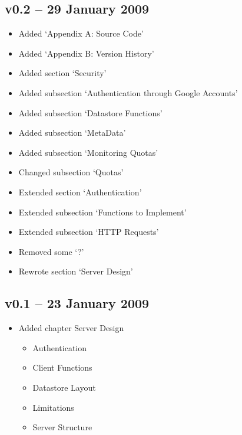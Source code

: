 \subsection*{v0.2 -- 29 January 2009}
\begin{itemize}
  \item Added `Appendix A: Source Code'
  \item Added `Appendix B: Version History'
  \item Added section `Security'
  \item Added subsection `Authentication through Google Accounts'
  \item Added subsection `Datastore Functions'
  \item Added subsection `MetaData'
  \item Added subsection `Monitoring Quotas'
  \item Changed subsection `Quotas'
  \item Extended section `Authentication'
  \item Extended subsection `Functions to Implement'
  \item Extended subsection `HTTP Requests'
  \item Removed some `?'
  \item Rewrote section `Server Design'
\end{itemize}

\subsection*{v0.1 -- 23 January 2009}
\begin{itemize}
  \item Added chapter Server Design
\begin{itemize}
  \item Authentication
  \item Client Functions
  \item Datastore Layout
  \item Limitations
  \item Server Structure
\end{itemize}
\end{itemize}